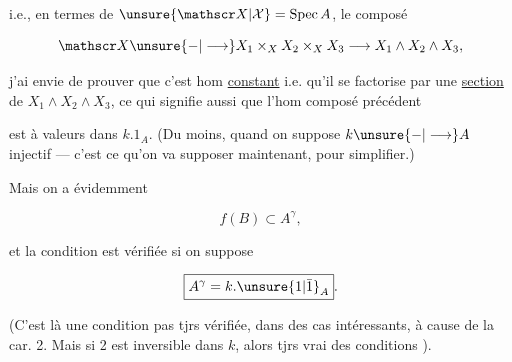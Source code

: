 
i.e., en termes de $\unsure{\mathscr X|\mathcal X}=\operatorname{Spec} A$, le composé

\[
 \mathscr X\unsure{\mathord{-}|\longrightarrow} X_1\times_X X_2\times_X X_3\longrightarrow X_1\wedge X_2\wedge X_3,
\]

j'ai envie de prouver que c'est  hom \uline{constant} i.e. qu'il se factorise par une \uline{section} de $X_1\wedge X_2\wedge X_3$, ce qui signifie aussi que l'hom composé précédent


est à valeurs dans $k.1_A$. (Du moins,  quand on suppose $k\unsure{\mathord{-}|\longrightarrow}A$ injectif --- c'est ce qu'on va supposer maintenant, pour simplifier.)

Mais on a évidemment

\[
 f(B)\subset A^\gamma,
\]

et la condition est vérifiée si on suppose

\[
 \boxed{A^\gamma=k.\unsure{1|\bar 1}_A}.
\]

(C'est là une condition pas tjrs vérifiée,  dans des cas intéressants, à cause de la car. 2. Mais si 2 est inversible \deleted{\unsure{,}} dans $k$, alors tjrs vrai  des conditions ).

